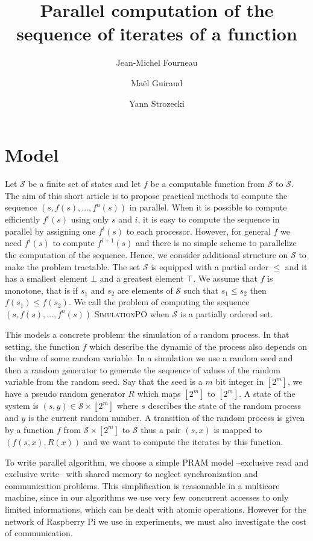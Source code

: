 \documentclass[a4paper,10pt]{article}
\title{Parallel computation of the sequence of iterates of a function }
\author{Jean-Michel Fourneau \and Maël Guiraud \and Yann Strozecki}
\newcommand{\cS}{\mathcal{S}}
\begin{document}
\maketitle

\begin{abstract}

\end{abstract}

\section{Model}

Let $\cS$ be a finite set of states and let $f$ be a computable function from $\cS$ to $\cS$. 
The aim of this short article is to propose practical methods to compute the sequence $(s,f(s),\dots,f^n(s))$ in parallel.
When it is possible to compute efficiently $f^i(s)$ using only $s$ and $i$, it is easy to compute the sequence
in parallel by assigning one $f^i(s)$ to each processor. However, for general $f$ we need $f^{i}(s)$ to compute $f^{i+1}(s)$ and there is no simple scheme to parallelize the computation of the sequence. 
Hence, we consider additional structure on $\cS$ to make the problem tractable. The set $\cS$ is equipped with a partial order 
$\leq$ and it has a smallest element $\bot$ and a greatest element $ \top$. We assume that $f$ is monotone, that is 
if $s_1$ and $s_2$ are elements of $\cS$ such that $s_1 \leq s_2$ then $f(s_1) \leq f(s_2)$.
We call the problem of computing the sequence $(s,f(s),\dots,f^n(s))$ \textsc{SimulationPO} when $\cS$ is a partially ordered set.

This models a concrete problem: the simulation of a random process. In that setting, the function $f$ which describe the dynamic of the process also depends on the value of some random variable. In a simulation we use a random seed and then a random generator to generate the sequence of values of the random variable from the random seed. Say that the seed is a $m$ bit integer in $[2^m]$, we have a pseudo random generator $R$ which maps $[2^m]$ to $[2^m]$. A state of the system is $(s,y) \in \cS \times [2^m]$ where $s$ describes the state of the random process and $y$ is the current random number. A transition of the random process is given by a function $f$ from $\cS \times [2^m]$ to $\cS$ thus a pair $(s,x)$ is mapped to $(f(s,x),R(x))$ and we want to compute the iterates by this function.

To write parallel algorithm, we choose a simple PRAM model --exclusive read and exclusive write-- with shared memory  to neglect synchronization and communication problems. This simplification is reasonnable in a multicore machine, since in our algorithms we use very few concurrent accesses to only limited informations, which can be dealt with atomic operations.  However for the network of Raspberry Pi we use in experiments, we must also investigate the cost of communication.
\end{document}
